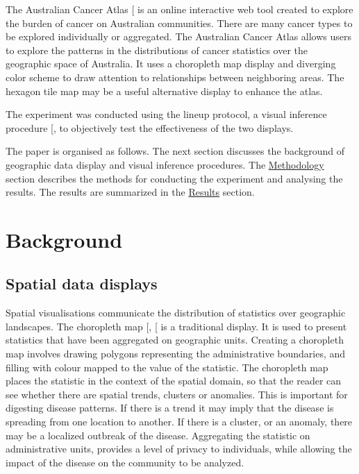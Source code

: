 \documentclass[
]{article}
\begin{document}
The Australian Cancer Atlas {[}\citeproc{ref-atlas}{2}{]} is an online
interactive web tool created to explore the burden of cancer on
Australian communities. There are many cancer types to be explored
individually or aggregated. The Australian Cancer Atlas allows users to
explore the patterns in the distributions of cancer statistics over the
geographic space of Australia. It uses a choropleth map display and
diverging color scheme to draw attention to relationships between
neighboring areas. The hexagon tile map may be a useful alternative
display to enhance the atlas.

The experiment was conducted using the lineup protocol, a visual
inference procedure {[}\citeproc{ref-GIIV}{3}{]}, to objectively test
the effectiveness of the two displays.

The paper is organised as follows. The next section discusses the
background of geographic data display and visual inference procedures.
The \hyperref[methodology]{Methodology} section describes the methods
for conducting the experiment and analysing the results. The results are
summarized in the \hyperref[results]{Results} section.

\section{Background}\label{background}

\subsection{Spatial data displays}\label{spatial-data-displays}

Spatial visualisations communicate the distribution of statistics over
geographic landscapes. The choropleth map {[}\citeproc{ref-EI}{4}{]},
{[}\citeproc{ref-BCM}{5}{]} is a traditional display. It is used to
present statistics that have been aggregated on geographic units.
Creating a choropleth map involves drawing polygons representing the
administrative boundaries, and filling with colour mapped to the value
of the statistic. The choropleth map places the statistic in the context
of the spatial domain, so that the reader can see whether there are
spatial trends, clusters or anomalies. This is important for digesting
disease patterns. If there is a trend it may imply that the disease is
spreading from one location to another. If there is a cluster, or an
anomaly, there may be a localized outbreak of the disease. Aggregating
the statistic on administrative units, provides a level of privacy to
individuals, while allowing the impact of the disease on the community
to be analyzed.
\end{document}
